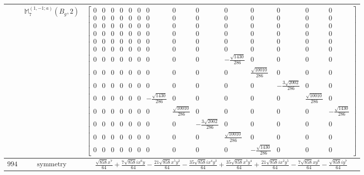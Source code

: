 \documentclass[fleqn,8pt,landscape]{jsarticle}
\begin{document}
\begin{longtable}{ccc}
$  $ & $ \mathbb{M}_{7}^{(1,-1;a)}(B_{g},2) $ & $ \begin{bmatrix} 0 & 0 & 0 & 0 & 0 & 0 & 0 & 0 & 0 & 0 & 0 & 0 & 0 & 0 \\ 0 & 0 & 0 & 0 & 0 & 0 & 0 & 0 & 0 & 0 & 0 & 0 & 0 & 0 \\ 0 & 0 & 0 & 0 & 0 & 0 & 0 & 0 & 0 & 0 & 0 & 0 & 0 & 0 \\ 0 & 0 & 0 & 0 & 0 & 0 & 0 & 0 & 0 & 0 & 0 & 0 & 0 & 0 \\ 0 & 0 & 0 & 0 & 0 & 0 & 0 & 0 & 0 & 0 & 0 & 0 & 0 & 0 \\ 0 & 0 & 0 & 0 & 0 & 0 & 0 & 0 & 0 & 0 & 0 & 0 & 0 & 0 \\ 0 & 0 & 0 & 0 & 0 & 0 & 0 & 0 & 0 & - \frac{\sqrt{1430}}{286} & 0 & 0 & 0 & 0 \\ 0 & 0 & 0 & 0 & 0 & 0 & 0 & 0 & 0 & 0 & \frac{\sqrt{10010}}{286} & 0 & 0 & 0 \\ 0 & 0 & 0 & 0 & 0 & 0 & 0 & 0 & 0 & 0 & 0 & - \frac{3 \sqrt{2002}}{286} & 0 & 0 \\ 0 & 0 & 0 & 0 & 0 & 0 & - \frac{\sqrt{1430}}{286} & 0 & 0 & 0 & 0 & 0 & \frac{\sqrt{10010}}{286} & 0 \\ 0 & 0 & 0 & 0 & 0 & 0 & 0 & \frac{\sqrt{10010}}{286} & 0 & 0 & 0 & 0 & 0 & - \frac{\sqrt{1430}}{286} \\ 0 & 0 & 0 & 0 & 0 & 0 & 0 & 0 & - \frac{3 \sqrt{2002}}{286} & 0 & 0 & 0 & 0 & 0 \\ 0 & 0 & 0 & 0 & 0 & 0 & 0 & 0 & 0 & \frac{\sqrt{10010}}{286} & 0 & 0 & 0 & 0 \\ 0 & 0 & 0 & 0 & 0 & 0 & 0 & 0 & 0 & 0 & - \frac{\sqrt{1430}}{286} & 0 & 0 & 0 \end{bmatrix} $ \\ \hline
$ 994 $ & $ \text{symmetry} $ & $ \frac{\sqrt{858} x^{7}}{64} + \frac{7 \sqrt{858} i x^{6} y}{64} - \frac{21 \sqrt{858} x^{5} y^{2}}{64} - \frac{35 \sqrt{858} i x^{4} y^{3}}{64} + \frac{35 \sqrt{858} x^{3} y^{4}}{64} + \frac{21 \sqrt{858} i x^{2} y^{5}}{64} - \frac{7 \sqrt{858} x y^{6}}{64} - \frac{\sqrt{858} i y^{7}}{64} $ \\

\end{longtable}
\end{document}
